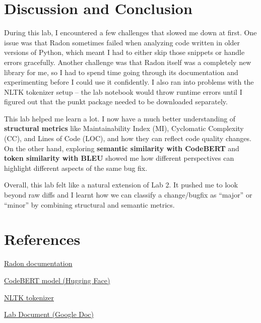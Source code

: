 \documentclass[10pt,a4paper]{report}
\begin{document}
\section{Discussion and Conclusion}

During this lab, I encountered a few challenges that slowed me down at first. One issue was that Radon sometimes failed when analyzing code written in older versions of Python, which meant I had to either skip those snippets or handle errors gracefully. Another challenge was that Radon itself was a completely new library for me, so I had to spend time going through its documentation and experimenting before I could use it confidently. I also ran into problems with the NLTK tokenizer setup -- the lab notebook would throw runtime errors until I figured out that the punkt package needed to be downloaded separately.

This lab helped me learn a lot. I now have a much better understanding of \textbf{structural metrics} like Maintainability Index (MI), Cyclomatic Complexity (CC), and Lines of Code (LOC), and how they can reflect code quality changes. On the other hand, exploring \textbf{semantic similarity with CodeBERT} and \textbf{token similarity with BLEU} showed me how different perspectives can highlight different aspects of the same bug fix.

Overall, this lab felt like a natural extension of Lab 2. It pushed me to look beyond raw diffs and I learnt how we can classify a change/bugfix as ``major'' or ``minor'' by combining structural and semantic metrics.


\section{References}
\begin{enumerate}[label={[\arabic*]}, itemsep=0.05em, topsep=0pt]
    \item \href{https://pypi.org/project/radon}{Radon documentation}
    \item \href{https://huggingface.co/microsoft/codebert-base}{CodeBERT model (Hugging Face)}
    \item \href{https://www.nltk.org/}{NLTK tokenizer}
    \item \href{https://drive.google.com/file/d/1erOvLfZuDeQw798jfHmX3t9MtKl8xmsN/view}{Lab Document (Google Doc)}
\end{enumerate}
\end{document}
